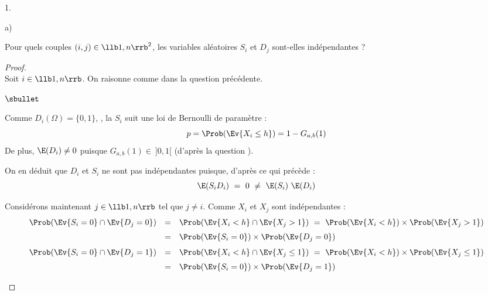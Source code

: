 \begin{noliste}{1.}
\begin{noliste}{a)}
  \item Pour quels couples $(i,j) \in \llb 1,n\rrb^2$, les variables
    aléatoires $S_i$ et $D_j$ sont-elles indépendantes ?

    \begin{proof}~\\
      Soit $i \in \llb 1,n\rrb$. On raisonne comme dans la question
      précédente.
      \begin{noliste}{$\sbullet$}
      \item Comme $D_i(\Omega) = \{0, 1\}$, , la \var $S_i$ suit une loi
      de Bernoulli de paramètre : 
      \[
	p= \Prob(\Ev{X_i \leq h}) = 1-G_{a,b}(1)
      \]
        De plus, $\E(D_i) \neq 0$ puisque $G_{a, b}(1) \in \ ]0,1[$
        (d'après la question ).

      \item On en déduit que $D_i$ et $S_i$ ne sont pas indépendantes
        puisque, d'après ce qui précède :
        \[
        \E(S_i D_i) \ = \ 0 \ \neq \ \E(S_i) \ \E(D_i)
        \]

      \item Considérons maintenant $j \in \llb 1, n\rrb$ tel que $j
        \neq i$. Comme $X_i$ et $X_j$ sont indépendantes :
        \[
        \begin{array}{rcl}
          \Prob(\Ev{S_i = 0} \cap \Ev{D_j = 0}) & = & \Prob(\Ev{X_i < h}
          \cap \Ev{X_j > 1}) \ = \ \Prob(\Ev{X_i < h}) \times 
	  \Prob(\Ev{X_j > 1}) 
	  \\[.2cm]
	  &=& \Prob(\Ev{S_i=0}) \times \Prob(\Ev{D_j=0})
        \end{array}
        \]
        \[
          \begin{array}{rcl}
            \Prob(\Ev{S_i = 0} \cap \Ev{D_j = 1}) & = & \Prob(\Ev{X_i < 
	    h} \cap \Ev{X_j \leq 1}) \ = \ \Prob(\Ev{X_i < h}) \times
           \Prob(\Ev{X_j \leq 1}) 
           \\[.2cm]
           &=& \Prob(\Ev{S_i=0}) \times \Prob(\Ev{D_j=1})
          \end{array}
        \]
        

\end{noliste}
\end{proof}
\end{noliste}
\end{noliste}
